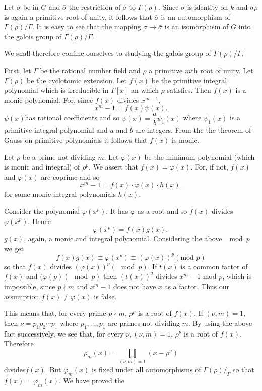 Let $\sigma$ be in $G$ and $\bar{\sigma}$ the restriction of
$\sigma$ to $\Gamma (\rho )$. Since $\sigma$ is identity on $k$ and
$\sigma \rho$ is again a primitive root of unity, it follows that
$\bar{\sigma }$ is an automorphism of $\Gamma (\rho) / \Gamma$. It is
easy to see that the mapping $\sigma \to \bar{\sigma}$ is an
isomorphism of $G$ into the galois group of $\Gamma (\rho) / \Gamma$.  

We shall therefore confine ourselves to studying the galois group of
$\Gamma (\rho) / \Gamma$.  

First, let $\Gamma$ be the rational number field and $\rho$ a
primitive $m$th root of unity. Let $\Gamma (\rho)$ be the cyclotomic
extension. Let $f(x)$ be the primitive integral polynomial which is
irreducible in $\Gamma [x]$ an which $\rho$ satisfies. Then $f(x)$ is
a monic polynomial. For, since $f(x)$ divides $x^{m - 1}$,  
$$
x^m - 1 = f(x)\psi (x).
$$
$\psi (x)$\pageoriginale has rational coefficients and so $\psi (x)  =
\dfrac{a}{b} 
\psi_1 (x)$ where $\psi_1(x)$ is a primitive integral polynomial and
$a$ and $b$ are integers. 
From the the theorem  of Gauss on primitive polynomials it follows
that $f(x)$ is monic. 

Let $p$ be a prime not dividing $m$. Let $\varphi (x)$ be the minimum
polynomial (which is monic and integral) of $\rho^p$. We assert
that $f(x) = \varphi (x)$. For, if not, $f(x)$ and $\varphi(x)$ are coprime
and so  
$$
x^m - 1 = f(x) \cdot \varphi(x) \cdot h(x) .
$$ 
for some monic integral polynomials $h(x)$.

Consider the polynomial $\varphi(x^p)$. It has $\varphi$ as a root
and so $f(x)$ divides $\varphi (x^p)$. Hence  
$$
\varphi (x^p) = f(x) g (x), 
$$
$g(x)$, again, a monic and integral polynomial. Considering the above
$\mod p $ we get  
$$
f (x) g(x) \equiv \varphi (x^p) \equiv (\varphi (x))^p (\text{mod } p)
$$
so that $f(x)$ divides $(\varphi (x))^p (\mod p )$. If $t(x)$ is a
common factor of $f(x)$ and $(\varphi (p) (\mod p )$  then $(t(x))^2$
divides $x^m -1$ mod $p$, which is impossible, since 
$p \nmid m$ and $x^m -1$ does not have $x$ as a factor. Thus our
assumption $f(x) \neq \varphi (x) $ is false.  

This means that, for every prime $p \nmid m$, $\rho ^p$ is a root
of $f(x)$. If $(\nu, m) = 1$, then $\nu = p_1 p_2 \cdots p_1$ where
$p_1, \ldots, p_1$ are primes not dividing $m$. By using the above
fact successively, we see 
that, for every $\nu, (\nu, m) = 1$, $\rho^\nu$ is a root of
$f(x)$. Therefore  
\begin{equation*}
\rho_m (x) = \prod\limits_{ (\nu, m ) = 1 } (x - \rho^\nu
)\tag{1}\label{c6:eq1}
\end{equation*}
divides\pageoriginale $f(x)$. But $\varphi_m(x)$ is fixed under all
automorphisms of  $\Gamma(\rho) /_\Gamma$ so that $f(x)= \varphi_m
(x)$. We have proved the    

